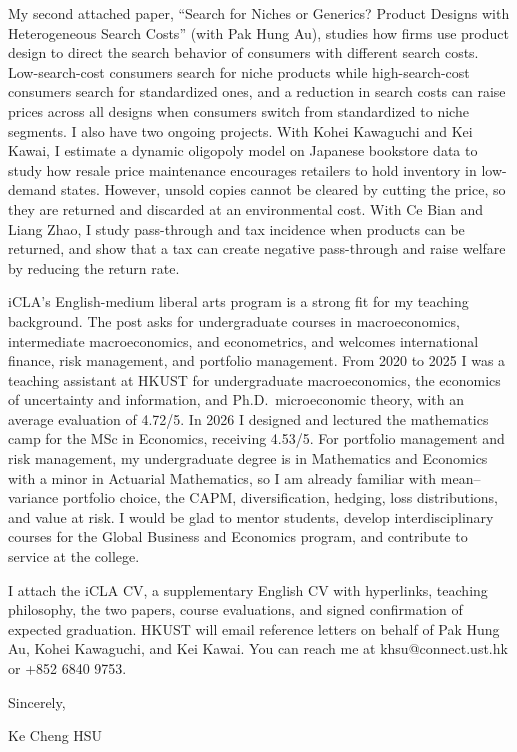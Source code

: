 \documentclass[11pt]{article}
\begin{document}
My second attached paper, ``Search for Niches or Generics? Product Designs with Heterogeneous Search Costs'' (with Pak Hung Au), studies how firms use product design to direct the search behavior of consumers with different search costs. Low-search-cost consumers search for niche products while high-search-cost consumers search for standardized ones, and a reduction in search costs can raise prices across all designs when consumers switch from standardized to niche segments. I also have two ongoing projects. With Kohei Kawaguchi and Kei Kawai, I estimate a dynamic oligopoly model on Japanese bookstore data to study how resale price maintenance encourages retailers to hold inventory in low-demand states. However, unsold copies cannot be cleared by cutting the price, so they are returned and discarded at an environmental cost. With Ce Bian and Liang Zhao, I study pass-through and tax incidence when products can be returned, and show that a tax can create negative pass-through and raise welfare by reducing the return rate.

iCLA's English-medium liberal arts program is a strong fit for my teaching background. The post asks for undergraduate courses in macroeconomics, intermediate macroeconomics, and econometrics, and welcomes international finance, risk management, and portfolio management. From 2020 to 2025 I was a teaching assistant at HKUST for undergraduate macroeconomics, the economics of uncertainty and information, and Ph.D.\ microeconomic theory, with an average evaluation of 4.72/5. In 2026 I designed and lectured the mathematics camp for the MSc in Economics, receiving 4.53/5. For portfolio management and risk management, my undergraduate degree is in Mathematics and Economics with a minor in Actuarial Mathematics, so I am already familiar with mean--variance portfolio choice, the CAPM, diversification, hedging, loss distributions, and value at risk. I would be glad to mentor students, develop interdisciplinary courses for the Global Business and Economics program, and contribute to service at the college.

I attach the iCLA CV, a supplementary English CV with hyperlinks, teaching philosophy, the two papers, course evaluations, and signed confirmation of expected graduation. HKUST will email reference letters on behalf of Pak Hung Au, Kohei Kawaguchi, and Kei Kawai. You can reach me at khsu@connect.ust.hk or +852 6840 9753.

\vspace{0.4em}
Sincerely,

\vspace{0.4em}
Ke Cheng HSU
\end{document}
